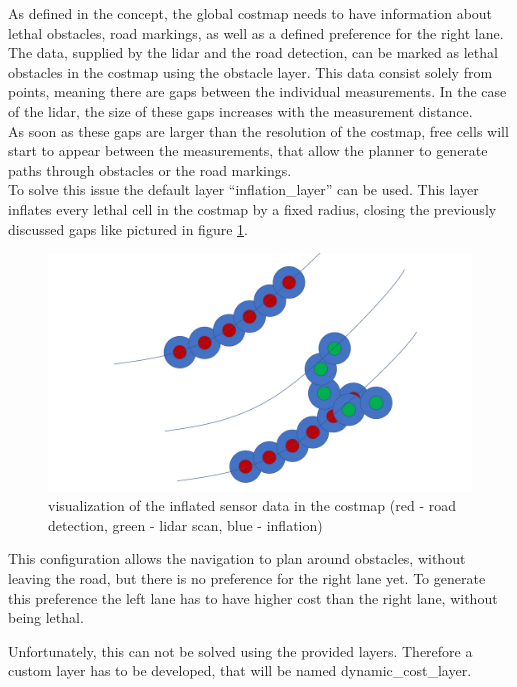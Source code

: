 As defined in the concept, the global costmap needs to have information about lethal obstacles, road markings, as well as a defined preference for the right lane.\\


The data, supplied by the lidar and the road detection, can be marked as lethal obstacles in the costmap using the obstacle layer. This data consist solely from points, meaning there are gaps between the individual measurements. In the case of the lidar, the size of these gaps increases with the measurement distance.\\

As soon as these gaps are larger than the resolution of the costmap, free cells will start to appear between the measurements, that allow the planner to generate paths through obstacles or the road markings.\\

To solve this issue the default layer ``inflation\_layer'' can be used. This layer inflates every lethal cell in the costmap by a fixed radius, closing the previously discussed gaps like pictured in figure \ref{costinfl}.\\

\begin{figure}[H]
	\centering
	\includegraphics[width=.7\textwidth]{Pictures/costmap inflation}
	\caption{visualization of the inflated sensor data in the costmap (red - road detection, green - lidar scan, blue - inflation)}
	\label{costinfl}
\end{figure}

This configuration allows the navigation to plan around obstacles, without leaving the road, but there is no preference for the right lane yet. To generate this preference the left lane has to have higher cost than the right lane, without being lethal.

Unfortunately, this can not be solved using the provided layers. Therefore a custom layer has to be developed, that will be named dynamic\_cost\_layer.

